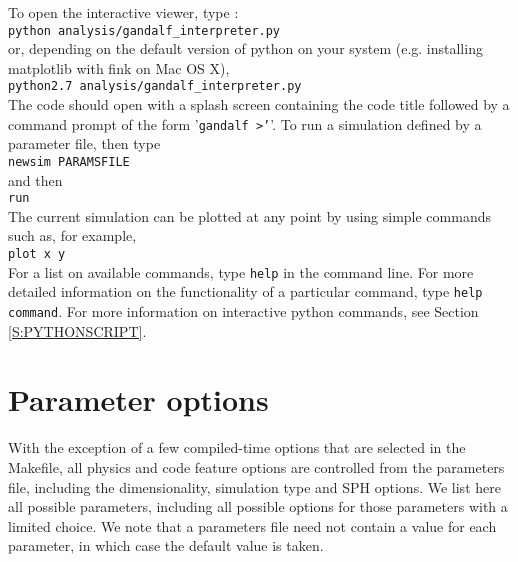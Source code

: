 \documentclass[a4paper]{article}
\newcommand{\var}[1]{\texttt{#1}}
\begin{document}
\noindent To open the interactive viewer, type : \\
\newline
\var{python analysis/gandalf\_interpreter.py} \\
\newline
or, depending on the default version of python on your system (e.g. installing matplotlib with fink on Mac OS X), \\
\newline
\var{python2.7 analysis/gandalf\_interpreter.py} \\
\newline
\noindent The code should open with a splash screen containing the code title followed by a command prompt of the form '\var{gandalf >'}'.  To run a simulation defined by a parameter file, then type \\
\newline
\var{newsim PARAMSFILE} \\
\newline
\noindent and then \\
\newline
\var{run} \\
\newline
\noindent The current simulation can be plotted at any point by using simple commands such as, for example, \\
\newline
\var{plot x y} \\
\newline
\noindent For a list on available commands, type \var{help} in the command line.  For more detailed information on the functionality of a particular command, type \var{help command}.  For more information on interactive python commands, see Section \ref{S:PYTHONSCRIPT}.

\newpage



\section{Parameter options} \label{S:PARAMETERS}

\noindent With the exception of a few compiled-time options that are selected in the Makefile, all physics and code feature options are controlled from the parameters file, including the dimensionality, simulation type and SPH options.  We list here all possible parameters, including all possible options for those parameters with a limited choice.  We note that a parameters file need not contain a value for each parameter, in which case the default value is taken.
\end{document}
